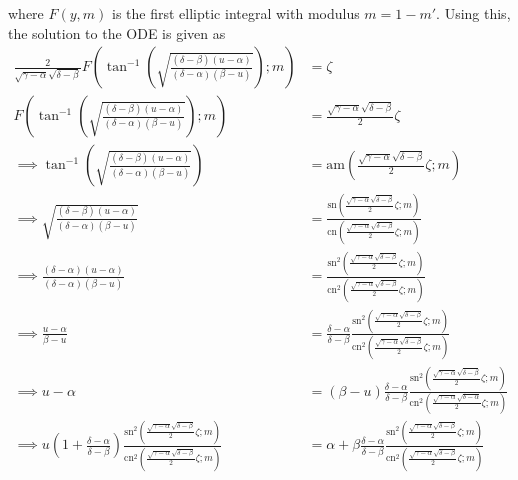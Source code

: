 \documentclass{article}
\begin{document}
\begin{itemize}
\begin{itemize}
        where $F(y,m)$ is the first elliptic integral with modulus $m = 1 - m'$. Using this, the solution to the ODE is given as
        \begin{align*}
            \frac{2}{\sqrt{\gamma - \alpha}\sqrt{\delta - \beta}}F\left(\tan^{-1}\left(\sqrt{\frac{(\delta - \beta)(u - \alpha)}{(\delta - \alpha)(\beta - u)}}\right);m\right) &= \zeta\\
            F\left(\tan^{-1}\left(\sqrt{\frac{(\delta - \beta)(u - \alpha)}{(\delta - \alpha)(\beta - u)}}\right);m\right) &= \frac{\sqrt{\gamma - \alpha}\sqrt{\delta - \beta}}{2}\zeta\\
            \implies \tan^{-1}\left(\sqrt{\frac{(\delta - \beta)(u - \alpha)}{(\delta - \alpha)(\beta - u)}}\right) &= \text{am}\left(\frac{\sqrt{\gamma - \alpha}\sqrt{\delta - \beta}}{2}\zeta;m\right)\\
            \implies \sqrt{\frac{(\delta - \beta)(u - \alpha)}{(\delta - \alpha)(\beta - u)}} &= \frac{\text{sn}\left(\frac{\sqrt{\gamma - \alpha}\sqrt{\delta - \beta}}{2}\zeta; m\right)}{\text{cn}\left(\frac{\sqrt{\gamma - \alpha}\sqrt{\delta - \beta}}{2}\zeta; m\right)}\\
            \implies \frac{(\delta - \alpha)(u - \alpha)}{(\delta - \alpha)(\beta - u)} &= \frac{\text{sn}^2\left(\frac{\sqrt{\gamma - \alpha}\sqrt{\delta - \beta}}{2}\zeta; m\right)}{\text{cn}^2\left(\frac{\sqrt{\gamma - \alpha}\sqrt{\delta - \beta}}{2}\zeta; m\right)}\\
            \implies \frac{u - \alpha}{\beta - u} &= \frac{\delta - \alpha}{\delta - \beta}\frac{\text{sn}^2\left(\frac{\sqrt{\gamma - \alpha}\sqrt{\delta - \beta}}{2}\zeta; m\right)}{\text{cn}^2\left(\frac{\sqrt{\gamma - \alpha}\sqrt{\delta - \beta}}{2}\zeta; m\right)}\\
            \implies u - \alpha &= (\beta - u)\frac{\delta - \alpha}{\delta - \beta}\frac{\text{sn}^2\left(\frac{\sqrt{\gamma - \alpha}\sqrt{\delta - \beta}}{2}\zeta; m\right)}{\text{cn}^2\left(\frac{\sqrt{\gamma - \alpha}\sqrt{\delta - \alpha}}{2}\zeta; m\right)}\\
            \implies u\left(1 + \frac{\delta - \alpha}{\delta - \beta}\right)\frac{\text{sn}^2\left(\frac{\sqrt{\gamma - \alpha}\sqrt{\delta - \beta}}{2}\zeta; m\right)}{\text{cn}^2\left(\frac{\sqrt{\gamma - \alpha}\sqrt{\delta - \beta}}{2}\zeta; m\right)} &= \alpha + \beta\frac{\delta - \alpha}{\delta - \beta}\frac{\text{sn}^2\left(\frac{\sqrt{\gamma - \alpha}\sqrt{\delta - \beta}}{2}\zeta; m\right)}{\text{cn}^2\left(\frac{\sqrt{\gamma - \alpha}\sqrt{\delta - \beta}}{2}\zeta; m\right)}

\end{align*}
\end{itemize}
\end{itemize}
\end{document}
